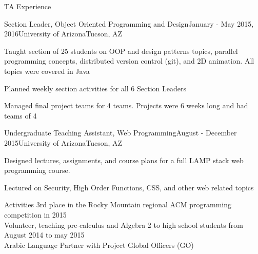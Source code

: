 \documentclass{resume} %
\begin{document}
\begin{rSection}{TA Experience}
	
	\begin{rSubsection}{Section Leader, Object Oriented Programming and Design}{January - May 2015, 2016}{University of Arizona}{Tucson, AZ}
		\item Taught section of 25 students on OOP and design patterns topics, parallel programming concepts, distributed version control (git), and 2D animation. All topics were covered in Java
		\item Planned weekly section activities for all 6 Section Leaders
		\item Managed final project teams for 4 teams. Projects were 6 weeks long and had teams of 4
	\end{rSubsection}
	\begin{rSubsection}{Undergraduate Teaching Assistant, Web Programming}{August - December 2015}{University of Arizona}{Tucson, AZ}
		\item Designed lectures, assignments, and course plans for a full LAMP stack web programming course. 
		\item Lectured on Security, High Order Functions, CSS, and other web related topics
	\end{rSubsection}
	
\end{rSection}


\begin{rSection}{Activities}
3rd place in the Rocky Mountain regional ACM programming competition in 2015 \\
Volunteer, teaching pre-calculus and Algebra 2 to high school students from August 2014 to may 2015\\
Arabic Language Partner with Project Global Officers (GO) \\
\end{rSection}

\end{document}

